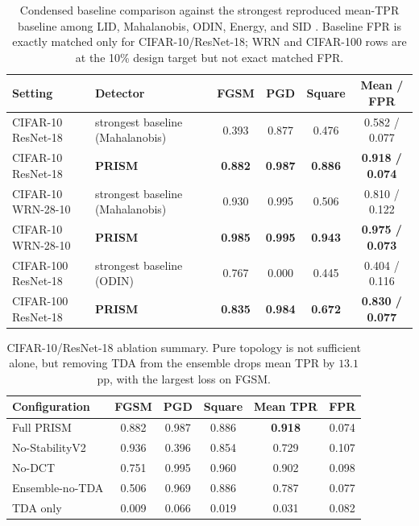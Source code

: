 \documentclass{article}
\newcommand{\prism}{\textsc{PRISM}\xspace}
\begin{document}
\begin{table}[t]
\centering
\small
\setlength{\tabcolsep}{4pt}
\begin{tabular}{llcccc}
\toprule
Setting & Detector & FGSM & PGD & Square & Mean / FPR \\
\midrule
CIFAR-10 ResNet-18 & strongest baseline (Mahalanobis) & 0.393 & 0.877 & 0.476 & 0.582 / 0.077 \\
CIFAR-10 ResNet-18 & \textbf{\prism} & \textbf{0.882} & \textbf{0.987} & \textbf{0.886} & \textbf{0.918 / 0.074} \\
\midrule
CIFAR-10 WRN-28-10 & strongest baseline (Mahalanobis) & 0.930 & 0.995 & 0.506 & 0.810 / 0.122 \\
CIFAR-10 WRN-28-10 & \textbf{\prism} & \textbf{0.985} & \textbf{0.995} & \textbf{0.943} & \textbf{0.975 / 0.073} \\
\midrule
CIFAR-100 ResNet-18 & strongest baseline (ODIN) & 0.767 & 0.000 & 0.445 & 0.404 / 0.116 \\
CIFAR-100 ResNet-18 & \textbf{\prism} & \textbf{0.835} & \textbf{0.984} & \textbf{0.672} & \textbf{0.830 / 0.077} \\
\bottomrule
\end{tabular}
\caption{Condensed baseline comparison against the strongest reproduced mean-TPR baseline among LID, Mahalanobis, ODIN, Energy, and SID \citep{ma2018characterizing,lee2018simple,liang2018enhancing,liu2020energy,tian2021detecting}. Baseline FPR is exactly matched only for CIFAR-10/ResNet-18; WRN and CIFAR-100 rows are at the 10\% design target but not exact matched FPR.}
\label{tab:baselines}
\end{table}

\begin{table}[t]
\centering
\small
\setlength{\tabcolsep}{4pt}
\begin{tabular}{lccccc}
\toprule
Configuration & FGSM & PGD & Square & Mean TPR & FPR \\
\midrule
Full \prism & 0.882 & 0.987 & 0.886 & \textbf{0.918} & 0.074 \\
No-StabilityV2 & 0.936 & 0.396 & 0.854 & 0.729 & 0.107 \\
No-DCT & 0.751 & 0.995 & 0.960 & 0.902 & 0.098 \\
Ensemble-no-TDA & 0.506 & 0.969 & 0.886 & 0.787 & 0.077 \\
TDA only & 0.009 & 0.066 & 0.019 & 0.031 & 0.082 \\
\bottomrule
\end{tabular}
\caption{CIFAR-10/ResNet-18 ablation summary. Pure topology is not sufficient alone, but removing TDA from the ensemble drops mean TPR by $13.1$ pp, with the largest loss on FGSM.}
\label{tab:ablation}
\end{table}
\end{document}
